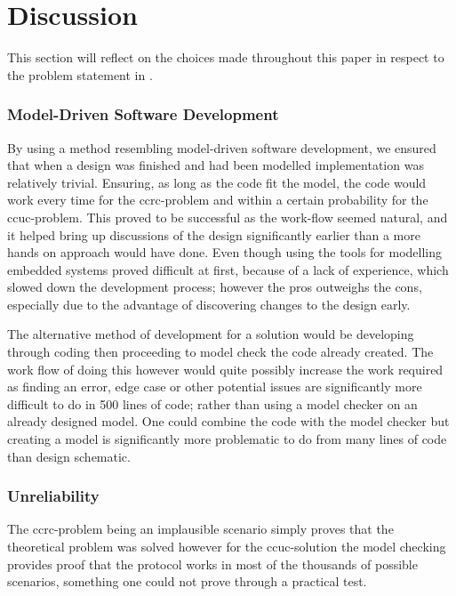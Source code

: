 \section{Discussion}\label{sec:discussion}
This section will reflect on the choices made throughout this paper in respect to the problem statement in .

\subsubsection{Model-Driven Software Development}
By using a method resembling model-driven software development, we ensured that when a design was finished and had been modelled implementation was relatively trivial.
Ensuring, as long as the code fit the model, the code would work every time for the \gls{ccrc}-problem and within a certain probability for the \gls{ccuc}-problem.
This proved to be successful as the work-flow seemed natural, and it helped bring up discussions of the design significantly earlier than a more hands on approach would have done.
Even though using the tools for modelling embedded systems proved difficult at first, because of a lack of experience, which slowed down the development process; however the pros outweighs the cons, especially due to the advantage of discovering changes to the design early.

The alternative method of development for a solution would be developing through coding then proceeding to model check the code already created.
The work flow of doing this however would quite possibly increase the work required as finding an error, edge case or other potential issues are significantly more difficult to do in 500 lines of code; rather than using a model checker on an already designed model.
One could combine the code with the model checker but creating a model is significantly more problematic to do from many lines of code than design schematic.

\subsubsection{Unreliability}
The \gls{ccrc}-problem being an implausible scenario simply proves that the theoretical problem was solved however for the \gls{ccuc}-solution the model checking provides proof that the protocol works in most of the thousands of possible scenarios, something one could not prove through a practical test.

